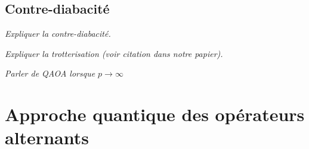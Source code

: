 
\subsection{Contre-diabacité}

\textcolor{mydarkred}{\textit{Expliquer la contre-diabacité.}}

\textcolor{mydarkred}{\textit{Expliquer la trotterisation (voir citation dans notre papier).}}

\textcolor{mydarkred}{\textit{Parler de QAOA lorsque $p \to \infty$}}



\section{Approche quantique des opérateurs alternants}

